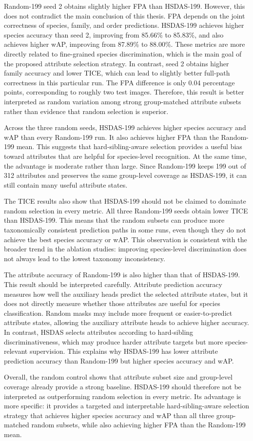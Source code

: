 Random-199 seed 2 obtains slightly higher FPA than HSDAS-199. However, this does not contradict the main conclusion of this thesis. FPA depends on the joint correctness of species, family, and order predictions. HSDAS-199 achieves higher species accuracy than seed 2, improving from 85.66\% to 85.83\%, and also achieves higher wAP, improving from 87.89\% to 88.00\%. These metrics are more directly related to fine-grained species discrimination, which is the main goal of the proposed attribute selection strategy. In contrast, seed 2 obtains higher family accuracy and lower TICE, which can lead to slightly better full-path correctness in this particular run. The FPA difference is only 0.04 percentage points, corresponding to roughly two test images. Therefore, this result is better interpreted as random variation among strong group-matched attribute subsets rather than evidence that random selection is superior.

Across the three random seeds, HSDAS-199 achieves higher species accuracy and wAP than every Random-199 run. It also achieves higher FPA than the Random-199 mean. This suggests that hard-sibling-aware selection provides a useful bias toward attributes that are helpful for species-level recognition. At the same time, the advantage is moderate rather than large. Since Random-199 keeps 199 out of 312 attributes and preserves the same group-level coverage as HSDAS-199, it can still contain many useful attribute states.

The TICE results also show that HSDAS-199 should not be claimed to dominate random selection in every metric. All three Random-199 seeds obtain lower TICE than HSDAS-199. This means that the random subsets can produce more taxonomically consistent prediction paths in some runs, even though they do not achieve the best species accuracy or wAP. This observation is consistent with the broader trend in the ablation studies: improving species-level discrimination does not always lead to the lowest taxonomy inconsistency.

The attribute accuracy of Random-199 is also higher than that of HSDAS-199. This result should be interpreted carefully. Attribute prediction accuracy measures how well the auxiliary heads predict the selected attribute states, but it does not directly measure whether those attributes are useful for species classification. Random masks may include more frequent or easier-to-predict attribute states, allowing the auxiliary attribute heads to achieve higher accuracy. In contrast, HSDAS selects attributes according to hard-sibling discriminativeness, which may produce harder attribute targets but more species-relevant supervision. This explains why HSDAS-199 has lower attribute prediction accuracy than Random-199 but higher species accuracy and wAP.

Overall, the random control shows that attribute subset size and group-level coverage already provide a strong baseline. HSDAS-199 should therefore not be interpreted as outperforming random selection in every metric. Its advantage is more specific: it provides a targeted and interpretable hard-sibling-aware selection strategy that achieves higher species accuracy and wAP than all three group-matched random subsets, while also achieving higher FPA than the Random-199 mean.